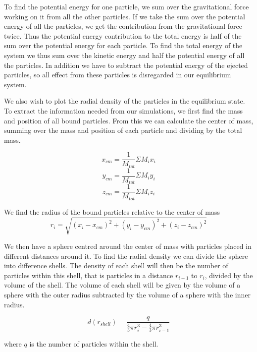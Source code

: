 \documentclass[a4paper,12pt, english]{article}
\begin{document}
To find the potential energy for one particle, we sum over the gravitational force working on it from all the other particles. If we take the sum over the potential energy of all the particles, we get the contribution from the gravitational force twice. Thus the potential energy contribution to the total energy is half of the sum over the potential energy for each particle.
To find the total energy of the system we thus sum over the kinetic energy and half the potential energy of all the particles. In addition we have to subtract the potential energy of the ejected particles, so all effect from these particles is disregarded in our equilibrium system.

We also wish to plot the radial density of the particles in the equilibrium state. To extract the information needed from our simulations, we first find the mass and position of all bound particles. From this we can calculate the center of mass, summing over the mass and position of each particle and dividing by the total mass. 


$$	x_{cm} = \frac{1}{M_{tot}} \Sigma M_i x_i $$
$$	y_{cm} = \frac{1}{M_{tot}} \Sigma M_i y_i $$
$$	z_{cm} = \frac{1}{M_{tot}} \Sigma M_i z_i $$

We find the radius of the bound particles relative to the center of mass
\[
r_i = \sqrt{(x_i - x_{cm})^2 + (y_i - y_{cm})^2 + (z_i - z_{cm})^2 }
\]

We then have a sphere centred around the center of mass with particles placed in different distances around it. To find the radial density we can divide the sphere into difference shells. The density of each shell will then be the number of particles within this shell, that is particles in a distance $r_{i-1}$ to $r_i$, divided by the volume of the shell. The volume of each shell will be given by the volume of a sphere with the outer radius subtracted by the volume of a sphere with the inner radius.

\[ 
d(r_{shell}) = \frac{q}{ \frac{4}{3} \pi r_i^3 - \frac{4}{3} \pi r_{i-1}^3}  
 \]
 
where $q$ is the number of particles within the shell. 
\end{document}

